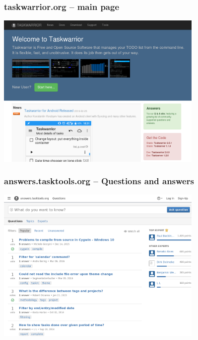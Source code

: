 \documentclass[t,handout]{beamer}
\begin{document}
\begin{frame}\frametitle{taskwarrior.org -- main page}
    \begin{center}
        \href{http://taskwarrior.org}{\includegraphics[width=10cm,height=7.5cm]{taskwarrior-org.png}}
    \end{center}
\end{frame}

\begin{frame}\frametitle{answers.tasktools.org -- Questions and answers}
    \begin{center}
        \href{http://answers.tasktools.org/}{\includegraphics[width=10cm,height=7.5cm]{answers-tasktools-org.png}}
    \end{center}
\end{frame}
\end{document}
